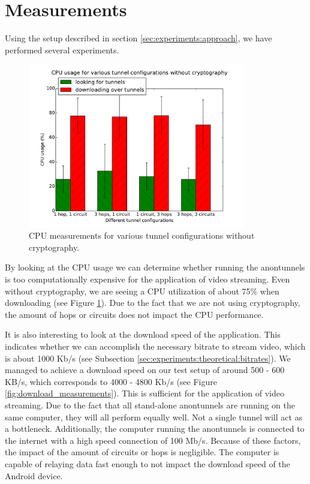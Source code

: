 \section{Measurements}
\label{sec:experiments:measurements}

Using the setup described in section \ref{sec:experiments:approach}, we have performed several experiments.

\begin{figure}[t]
	\centering
	\includegraphics[width=0.85\textwidth]{graphics/cpu.pdf}
	\caption{CPU measurements for various tunnel configurations without cryptography.}
	\label{fig:cpu_measurements}
\end{figure}

By looking at the CPU usage we can determine whether running the anontunnels is too computationally expensive for the application of video streaming. Even without cryptography, we are seeing a CPU utilization of about 75\% when downloading (see Figure \ref{fig:cpu_measurements}). Due to the fact that we are not using cryptography, the amount of hops or circuits does not impact the CPU performance.

It is also interesting to look at the download speed of the application. This indicates whether we can accomplish the necessary bitrate to stream video, which is about 1000 Kb/s (see Subsection \ref{sec:experiments:theoretical:bitrates}). We managed to achieve a download speed on our test setup of around 500 - 600 KB/s, which corresponds to 4000 - 4800 Kb/s (see Figure \ref{fig:download_measurements}). This is sufficient for the application of video streaming. Due to the fact that all stand-alone anontunnels are running on the same computer, they will all perform equally well. Not a single tunnel will act as a bottleneck. Additionally, the computer running the anontunnels is connected to the internet with a high speed connection of 100 Mb/s. Because of these factors, the impact of the amount of circuits or hops is negligible. The computer is capable of relaying data fast enough to not impact the download speed of the Android device.

